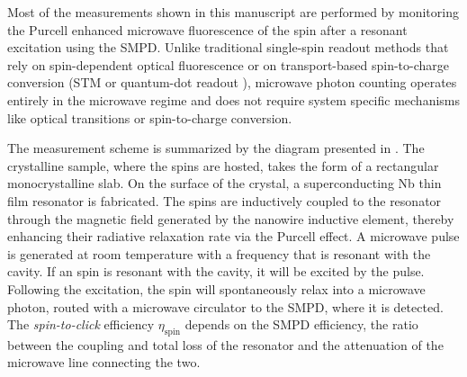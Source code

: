 Most of the measurements shown in this manuscript are performed by monitoring the Purcell enhanced microwave fluorescence of the \Er spin after a resonant excitation using the SMPD. Unlike traditional single-spin readout methods that rely on spin-dependent optical fluorescence  or on transport-based spin-to-charge conversion (STM  or quantum-dot readout ), microwave photon counting operates entirely in the microwave regime and does not require system specific mechanisms like optical transitions or spin-to-charge conversion. 

The measurement scheme is summarized by the diagram presented in . The crystalline \Ca sample, where the \Er spins are hosted, takes the form of a rectangular monocrystalline slab. On the surface of the crystal, a superconducting Nb thin film resonator is fabricated. The \Er spins are inductively coupled to the resonator through the magnetic field generated by the nanowire inductive element, thereby enhancing their radiative relaxation rate via the Purcell effect. A microwave pulse is generated at room temperature with a frequency that is resonant with the cavity. If an \Er spin is resonant with the cavity, it will be excited by the pulse. Following the excitation, the spin will spontaneously relax into a microwave photon, routed with a microwave circulator to the SMPD, where it is detected. The \textit{spin-to-click} efficiency $\eta_\text{spin}$ depends on the SMPD efficiency, the ratio between the coupling and total loss of the resonator and the attenuation of the microwave line connecting the two.

